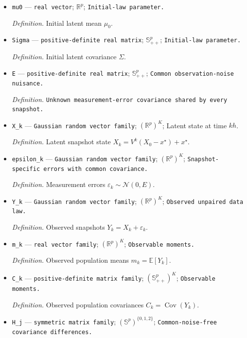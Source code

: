 \documentclass{article}
\begin{document}
\begin{itemize}
  \item \texttt{mu0} --- \texttt{real vector}; \(\mathbb R^p\); \texttt{Initial-\allowbreak{}law parameter.}
  \par\smallskip\noindent\emph{Definition.} Initial latent mean \(\mu_0\).
  \item \texttt{Sigma} --- \texttt{positive-\allowbreak{}definite real matrix}; \(\mathbb S_{++}^{p}\); \texttt{Initial-\allowbreak{}law parameter.}
  \par\smallskip\noindent\emph{Definition.} Initial latent covariance \(\Sigma\).
  \item \texttt{E} --- \texttt{positive-\allowbreak{}definite real matrix}; \(\mathbb S_{++}^{p}\); \texttt{Common observation-\allowbreak{}noise nuisance.}
  \par\smallskip\noindent\emph{Definition.} \texttt{Unknown measurement-\allowbreak{}error covariance shared by every snapshot.}
  \item \texttt{X\_\allowbreak{}k} --- \texttt{Gaussian random vector family}; \((\mathbb R^p)^K\); Latent state at time \(kh\).
  \par\smallskip\noindent\emph{Definition.} Latent snapshot state \(X_k=V^k(X_0-x^\star)+x^\star\).
  \item \texttt{epsilon\_\allowbreak{}k} --- \texttt{Gaussian random vector family}; \((\mathbb R^p)^K\); \texttt{Snapshot-\allowbreak{}specific errors with common covariance.}
  \par\smallskip\noindent\emph{Definition.} Measurement errors \(\varepsilon_k\sim\mathcal N(0,E)\).
  \item \texttt{Y\_\allowbreak{}k} --- \texttt{Gaussian random vector family}; \((\mathbb R^p)^K\); \texttt{Observed unpaired data law.}
  \par\smallskip\noindent\emph{Definition.} Observed snapshots \(Y_k=X_k+\varepsilon_k\).
  \item \texttt{m\_\allowbreak{}k} --- \texttt{real vector family}; \((\mathbb R^p)^K\); \texttt{Observable moments.}
  \par\smallskip\noindent\emph{Definition.} Observed population means \(m_k=\mathbb E[Y_k]\).
  \item \texttt{C\_\allowbreak{}k} --- \texttt{positive-\allowbreak{}definite matrix family}; \((\mathbb S_{++}^{p})^K\); \texttt{Observable moments.}
  \par\smallskip\noindent\emph{Definition.} Observed population covariances \(C_k=\operatorname{Cov}(Y_k)\).
  \item \texttt{H\_\allowbreak{}j} --- \texttt{symmetric matrix family}; \((\mathbb S^{p})^{\{0,1,2\}}\); \texttt{Common-\allowbreak{}noise-\allowbreak{}free covariance differences.}

\end{itemize}
\end{document}
